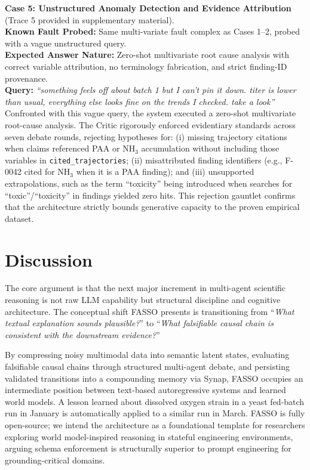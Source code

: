 \documentclass[11pt]{article}
\begin{document}
\textbf{Case 5: Unstructured Anomaly Detection and Evidence Attribution} (Trace 5 provided in supplementary material). \\
\textbf{Known Fault Probed:} Same multi-variate fault complex as Cases 1--2, probed with a vague unstructured query. \\
\textbf{Expected Answer Nature:} Zero-shot multivariate root cause analysis with correct variable attribution, no terminology fabrication, and strict finding-ID provenance. \\
\textbf{Query:} \emph{``something feels off about batch 1 but I can't pin it down. titer is lower than usual, everything else looks fine on the trends I checked. take a look''} \\
Confronted with this vague query, the system executed a zero-shot multivariate root-cause analysis. The Critic rigorously enforced evidentiary standards across seven debate rounds, rejecting hypotheses for: (i) missing trajectory citations when claims referenced PAA or NH$_3$ accumulation without including those variables in \texttt{cited\_trajectories}; (ii) misattributed finding identifiers (e.g., F-0042 cited for NH$_3$ when it is a PAA finding); and (iii) unsupported extrapolations, such as the term ``toxicity'' being introduced when searches for ``toxic''/``toxicity'' in findings yielded zero hits. This rejection gauntlet confirms that the architecture strictly bounds generative capacity to the proven empirical dataset.

\section{Discussion}
\label{sec:discussion}

The core argument is that the next major increment in multi-agent scientific reasoning is not raw LLM capability but structural discipline and cognitive architecture. The conceptual shift FASSO presents is transitioning from ``\emph{What textual explanation sounds plausible?}'' to ``\emph{What falsifiable causal chain is consistent with the downstream evidence?}''

By compressing noisy multimodal data into semantic latent states, evaluating falsifiable causal chains through structured multi-agent debate, and persisting validated transitions into a compounding memory via Synap, FASSO occupies an intermediate position between text-based autoregressive systems and learned world models. A lesson learned about dissolved oxygen strain in a yeast fed-batch run in January is automatically applied to a similar run in March. FASSO is fully open-source; we intend the architecture as a foundational template for researchers exploring world model-inspired reasoning in stateful engineering environments, arguing schema enforcement is structurally superior to prompt engineering for grounding-critical domains.
\end{document}
